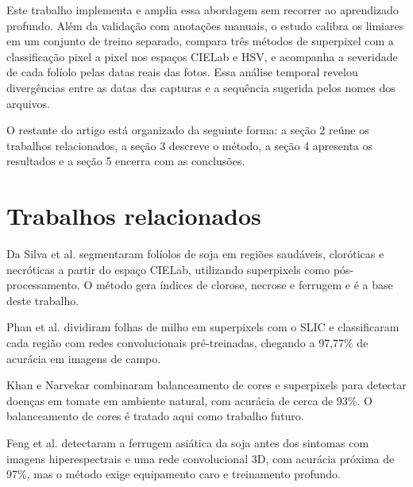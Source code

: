 \documentclass[10pt,a4paper,twocolumn]{article}
\begin{document}
Este trabalho implementa e amplia essa abordagem sem recorrer ao
aprendizado profundo. Além da validação com anotações manuais, o estudo
calibra os limiares em um conjunto de treino separado, compara três
métodos de superpixel com a classificação pixel a pixel nos espaços
CIELab e HSV, e acompanha a severidade de cada folíolo pelas datas reais
das fotos. Essa análise temporal revelou divergências entre as datas das
capturas e a sequência sugerida pelos nomes dos arquivos.

O restante do artigo está organizado da seguinte forma: a seção 2 reúne
os trabalhos relacionados, a seção 3 descreve o método, a seção 4
apresenta os resultados e a seção 5 encerra com as conclusões.

\section{Trabalhos relacionados}

Da Silva et al. \cite{dasilva2022} segmentaram folíolos de soja em
regiões saudáveis, cloróticas e necróticas a partir do espaço CIELab,
utilizando superpixels como pós-processamento. O método gera índices de
clorose, necrose e ferrugem e é a base deste trabalho.

Phan et al. \cite{phan2022} dividiram folhas de milho em superpixels
com o SLIC e classificaram cada região com redes convolucionais
pré-treinadas, chegando a 97,77\% de acurácia em imagens de campo.

Khan e Narvekar \cite{khan2022} combinaram balanceamento de cores e
superpixels para detectar doenças em tomate em ambiente natural, com
acurácia de cerca de 93\%. O balanceamento de cores é tratado aqui como
trabalho futuro.

Feng et al. \cite{feng2024} detectaram a ferrugem asiática da soja antes
dos sintomas com imagens hiperespectrais e uma rede convolucional 3D,
com acurácia próxima de 97\%, mas o método exige equipamento caro e
treinamento profundo.
\end{document}
